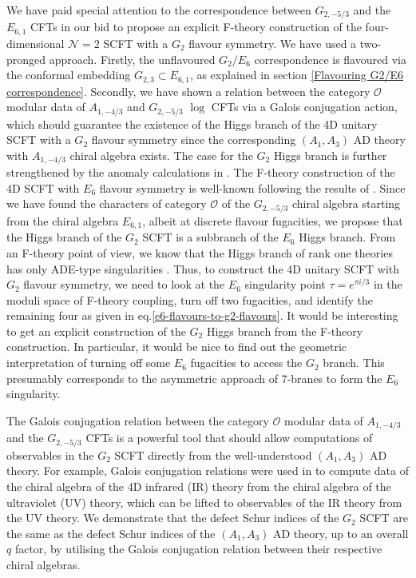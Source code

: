 \documentclass[a4paper,12pt]{article}
\begin{document}
We have paid special attention to the correspondence between $G_{2,-5/3}$ and the $E_{6,1}$ CFTs in our bid to propose an explicit F-theory construction of the four-dimensional $\mathcal{N}=2$ SCFT with a $G_2$ flavour symmetry. We have used a two-pronged approach. Firstly, the unflavoured $G_2/E_6$ correspondence is flavoured via the conformal embedding $G_{2,3}\subset E_{6,1}$, as explained in section \ref{Flavouring G2/E6 correspondence}. Secondly, we have shown a relation between the category $\mathcal{O}$ modular data of $A_{1,-4/3}$ and $G_{2,-5/3}$ $\log$ CFTs via a Galois conjugation action, which should guarantee the existence of the Higgs branch of the 4D unitary SCFT with a $G_2$ flavour symmetry since the corresponding $(A_1, A_3)$ AD theory with $A_{1,-4/3}$ chiral algebra exists. The case for the $G_2$ Higgs branch is further strengthened by the anomaly calculations in \cite{Shimizu:2017kzs}. The F-theory construction of the 4D SCFT with $E_6$ flavour symmetry is well-known following the results of \cite{Dasgupta:1996ij}. Since we have found the characters of category $\mathcal{O}$ of the $G_{2,-5/3}$ chiral algebra starting from the chiral algebra $E_{6,1}$, albeit at discrete flavour fugacities, we propose that the Higgs branch of the $G_2$ SCFT is a subbranch of the $E_6$ Higgs branch. From an F-theory point of view, we know that the Higgs branch of rank one theories has only ADE-type singularities \cite{Sen:1996vd, Dasgupta:1996ij}. Thus, to construct the 4D unitary SCFT with $G_2$ flavour symmetry, we need to look at the $E_6$ singularity point $\tau=e^{\pi i/3}$ in the moduli space of F-theory coupling, turn off two fugacities, and identify the remaining four as given in eq.\eqref{e6-flavours-to-g2-flavours}. It would be interesting to get an explicit construction of the $G_2$ Higgs branch from the F-theory construction. In particular, it would be nice to find out the geometric interpretation of turning off some $E_6$ fugacities to access the $G_2$ branch. This presumably corresponds to the asymmetric approach of 7-branes to form the $E_6$ singularity.

The Galois conjugation relation between the category $\mathcal{O}$ modular data of $A_{1,-4/3}$ and the $G_{2,-5/3}$ CFTs is a powerful tool that should allow computations of observables in the $G_2$ SCFT directly from the well-understood $(A_1,A_3)$ AD theory. For example, Galois conjugation relations were used in \cite{Buican:2019huq} to compute data of the chiral algebra of the 4D infrared (IR) theory from the chiral algebra of the ultraviolet (UV) theory, which can be lifted to observables of the IR theory from the UV theory. We demonstrate that the defect Schur indices of the $G_2$ SCFT are the same as the defect Schur indices of the $(A_1, A_3)$ AD theory, up to an overall $q$ factor, by utilising the Galois conjugation relation between their respective chiral algebras.
\end{document}
